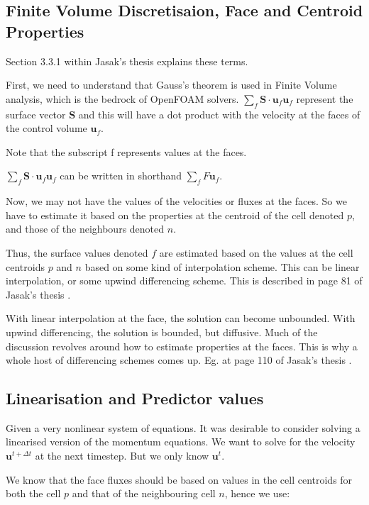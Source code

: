 \documentclass[masters]{ucbthesis}
\renewcommand{\_}{\kern-1.5pt\textunderscore\kern-1.5pt}
\begin{document}
\subsection{Finite Volume Discretisaion, Face and Centroid Properties}
Section 3.3.1 within Jasak's thesis explains these terms.

First, we need to understand that Gauss's theorem is used in Finite 
Volume analysis, which is the bedrock of OpenFOAM solvers. 
$\sum_f \mathbf{S} \cdot \mathbf{u}_f\mathbf{u}_f$ represent the surface 
vector $\mathbf{S}$ and this will have a dot product with the velocity 
at the faces of the control volume $\mathbf{u}_f$.

Note that the subscript f represents values at the faces.

$\sum_f \mathbf{S} \cdot \mathbf{u}_f\mathbf{u}_f$
can be written in shorthand $\sum_f F \mathbf{u}_f$.

Now, we may not have the values of the velocities or fluxes at the 
faces. So we have to estimate it based on the properties at the 
centroid of the cell denoted $p$, and those of the neighbours denoted $n$.

Thus, the surface values denoted $f$ are estimated based on the values 
at the cell centroids $p$ and $n$ based on some kind of interpolation 
scheme. This can be linear interpolation, or some upwind differencing scheme.
This is described in page 81 of Jasak's thesis \citep{jasak1996error}.

With linear interpolation at the face, the solution can become unbounded.
With upwind differencing, the solution is bounded, but diffusive. Much 
of the discussion revolves around how to estimate properties at the 
faces. This is why a whole host of differencing schemes comes up. Eg. 
at page 110 of Jasak's thesis \citep{jasak1996error}.

\subsection{Linearisation and Predictor values}

Given a very nonlinear system of equations. It was desirable to 
consider solving a linearised version of the momentum equations.
We want to solve for the velocity $\mathbf{u}^{t + \Delta t}$ at the 
next timestep. But we only know $\mathbf{u}^{t }$.

We know that the face fluxes should be based on values in the cell 
centroids for both the cell $p$ and that of the neighbouring cell $n$,
hence we use:
\end{document}
